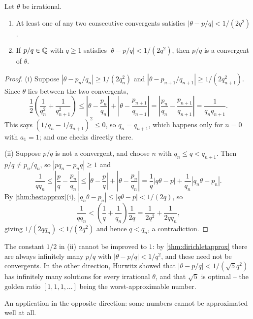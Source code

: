 \documentclass[a4paper]{scrartcl}
\begin{document}
\begin{theorem}\label{thm:converse}
	Let $\theta$ be irrational.
	\begin{enumerate}[label=(\roman*)]
		\item At least one of any two consecutive convergents satisfies $|\theta - p/q| < 1/(2q^2)$.
		\item If $p/q \in \mathbb{Q}$ with $q \geq 1$ satisfies $|\theta - p/q| < 1/(2q^2)$, then $p/q$ is a convergent of $\theta$.
	\end{enumerate}
\end{theorem}
\begin{proof}
	(i) Suppose $|\theta - p_n/q_n| \geq 1/(2q_n^2)$ and $|\theta - p_{n+1}/q_{n+1}| \geq 1/(2q_{n+1}^2)$. Since $\theta$ lies between the two convergents,
	$$
	\frac12\left(\frac1{q_n^2} + \frac1{q_{n+1}^2}\right) \leq \left|\theta - \frac{p_n}{q_n}\right| + \left|\theta - \frac{p_{n+1}}{q_{n+1}}\right| = \left|\frac{p_n}{q_n} - \frac{p_{n+1}}{q_{n+1}}\right| = \frac1{q_nq_{n+1}}.
	$$
	This says $(1/q_n - 1/q_{n+1})^2 \leq 0$, so $q_n = q_{n+1}$, which happens only for $n = 0$ with $a_1 = 1$; and one checks directly there.

	(ii) Suppose $p/q$ is not a convergent, and choose $n$ with $q_n \leq q < q_{n+1}$. Then $p/q \neq p_n/q_n$, so $|pq_n - p_nq| \geq 1$ and
	$$
	\frac1{qq_n} \leq \left|\frac pq - \frac{p_n}{q_n}\right| \leq \left|\theta - \frac pq\right| + \left|\theta - \frac{p_n}{q_n}\right| = \frac1q|q\theta - p| + \frac1{q_n}|q_n\theta - p_n|.
	$$
	By \autoref{thm:bestapprox}(i), $|q_n\theta - p_n| \leq |q\theta - p| < 1/(2q)$, so
	$$
	\frac1{qq_n} < \left(\frac1q + \frac1{q_n}\right)\frac{1}{2q} = \frac1{2q^2} + \frac1{2qq_n},
	$$
	giving $1/(2qq_n) < 1/(2q^2)$ and hence $q < q_n$, a contradiction.
\end{proof}

\begin{remark}
	The constant $1/2$ in (ii) cannot be improved to $1$: by \autoref{thm:dirichletapprox} there are always infinitely many $p/q$ with $|\theta - p/q| < 1/q^2$, and these need not be convergents. In the other direction, Hurwitz showed that $|\theta - p/q| < 1/(\sqrt5 q^2)$ has infinitely many solutions for every irrational $\theta$, and that $\sqrt5$ is optimal -- the golden ratio $[1,1,1,\dots]$ being the worst-approximable number.
\end{remark}

An application in the opposite direction: some numbers cannot be approximated well at all.
\end{document}
